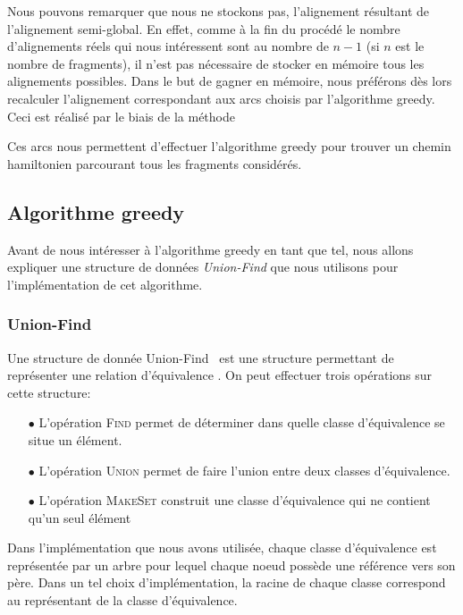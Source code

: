 Nous pouvons remarquer que nous ne stockons pas, l'alignement résultant de l'alignement semi-global. En effet, comme à la fin du procédé le nombre d'alignements réels qui nous intéressent sont au nombre de $n-1$ (si $n$ est le nombre de fragments), il n'est pas nécessaire de stocker en mémoire tous les alignements possibles. Dans le but de gagner en mémoire, nous préférons dès lors recalculer l'alignement correspondant aux arcs choisis par l'algorithme greedy. Ceci est réalisé par le biais de la méthode \

Ces arcs nous permettent d'effectuer l'algorithme greedy pour trouver un chemin hamiltonien parcourant tous les fragments considérés.


\subsection{Algorithme greedy}
\label{subsection:greedy}

Avant de nous intéresser à l'algorithme greedy en tant que tel, nous allons expliquer une structure de données \emph{Union-Find} que nous utilisons pour l'implémentation de cet algorithme.

\subsubsection{Union-Find}

Une structure de donnée \og Union-Find \fg~est une structure permettant de représenter une relation d'équivalence . On peut effectuer trois opérations sur cette structure:
\begin{itemize}
\item[$\bullet$] L'opération \textsc{Find} permet de déterminer dans quelle classe d'équivalence se situe un élément.
\item[$\bullet$] L'opération \textsc{Union} permet de faire l'union entre deux classes d'équivalence.
\item[$\bullet$] L'opération \textsc{MakeSet} construit une classe d'équivalence qui ne contient qu'un seul élément
\end{itemize}

Dans l'implémentation que nous avons utilisée, chaque classe d'équivalence est représentée par un arbre pour lequel chaque noeud possède une référence vers son père. Dans un tel choix d'implémentation, la racine de chaque classe correspond au représentant de la classe d'équivalence.

